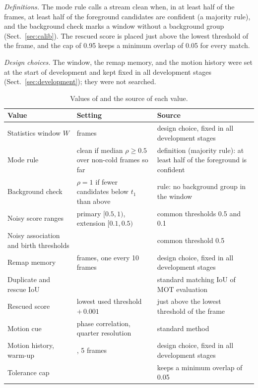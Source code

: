 \emph{Definitions.} The mode rule calls a stream clean when, in at least half of the frames, at
least half of the foreground candidates are confident (a majority rule), and the background check
marks a window without a background group (Sect.~\ref{sec:calib}). The
rescued score is placed just above the lowest threshold of the frame, and the cap of 0.95 keeps a
minimum overlap of 0.05 for every match.

\emph{Design choices.} The window, the remap memory, and the motion history were set at the start
of development and kept fixed in all development stages (Sect.~\ref{sec:development}); they were
not searched.

\begin{table}[t]
\caption{Values of \scl{} and the source of each value.}
\label{tab:constants}
\centering\footnotesize
\setlength{\tabcolsep}{4pt}
\begin{tabular}{@{}>{\raggedright\arraybackslash}p{40mm}>{\raggedright\arraybackslash}p{52mm}>{\raggedright\arraybackslash}p{58mm}@{}}
\toprule
Value & Setting & Source\\
\midrule
Statistics window $W$ & 10 frames & design choice, fixed in all development stages\\
Mode rule & clean if median $\rho\ge0.5$ over non-cold frames so far & definition (majority rule): at least half of the foreground is confident\\
Background check & $\rho=1$ if fewer candidates below $t_1$ than above & rule: no background group in the window\\
Noisy score ranges & primary $[0.5,1)$, extension $[0.1,0.5)$ & common thresholds 0.5 and 0.1\\
Noisy association and birth thresholds & 0.5 & common threshold 0.5\\
Remap memory & 20 frames, one every 10 frames & design choice, fixed in all development stages\\
Duplicate and rescue IoU & 0.5 & standard matching IoU of MOT evaluation\\
Rescued score & lowest used threshold $+\,0.001$ & just above the lowest threshold of the frame\\
Motion cue & phase correlation, quarter resolution & standard method \cite{reddy1996phasecorr}\\
Motion history, warm-up & 100, 5 frames & design choice, fixed in all development stages\\
Tolerance cap & 0.95 & keeps a minimum overlap of 0.05\\
\bottomrule
\end{tabular}
\end{table}

